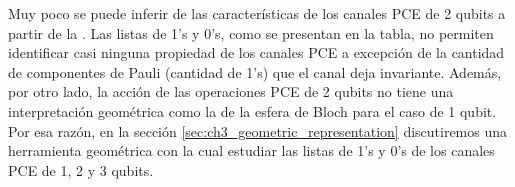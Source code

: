 Muy poco se puede inferir de las características de los canales 
PCE de 2 qubits a partir 
de la . Las listas de 1's y 0's, 
como se presentan en la tabla, no permiten identificar casi ninguna 
propiedad de los canales PCE a excepción de la cantidad de componentes 
de Pauli (cantidad de 1's) que el canal deja invariante. Además, por otro 
lado, la acción de las operaciones PCE de 2 qubits no tiene una 
interpretación geométrica como la de la esfera de Bloch para 
el caso de 1 qubit. Por esa razón, en la sección 
\ref{sec:ch3_geometric_representation} discutiremos una 
herramienta geométrica con la cual estudiar las listas de 1's 
y 0's de los canales PCE de 1, 2 y 3 qubits.
\begin{table}[]
\centering
{}
\end{table}
